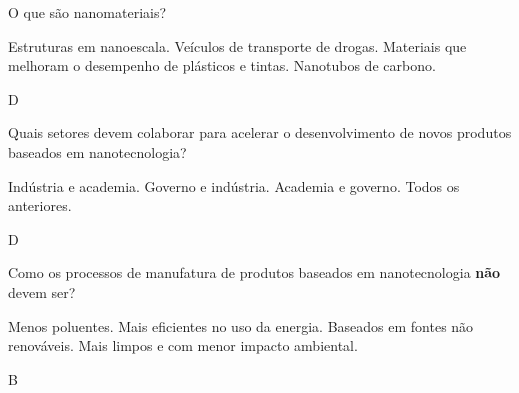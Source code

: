\documentclass[10pt]{scrartcl}
\begin{document}
\begin{exercise}[points=1]
O que são nanomateriais?
\begin{choice}
\choice Estruturas em nanoescala.
\choice Veículos de transporte de drogas.
\choice Materiais que melhoram o desempenho de plásticos e tintas.
\choice Nanotubos de carbono.
\end{choice}
\end{exercise}
\begin{solution}
D
\end{solution}





\begin{exercise}[points=1]
Quais setores devem colaborar para acelerar o desenvolvimento de novos produtos baseados em nanotecnologia?
\begin{choice}
\choice Indústria e academia.
\choice Governo e indústria.
\choice Academia e governo.
\choice Todos os anteriores.
\end{choice}
\end{exercise}
\begin{solution}
D
\end{solution}


\begin{exercise}[points=1]
Como os processos de manufatura de produtos baseados em nanotecnologia \textbf{não} devem ser?
\begin{choice}
\choice Menos poluentes.
\choice Mais eficientes no uso da energia.
\choice Baseados em fontes não renováveis.
\choice Mais limpos e com menor impacto ambiental.
\end{choice}
\end{exercise}
\begin{solution}
B
\end{solution}







\end{document}
